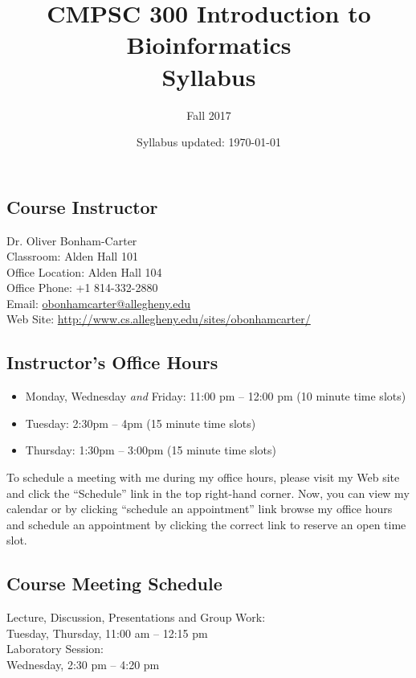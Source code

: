 \documentclass[11pt]{article} %
\title{\textbf{CMPSC 300 Introduction to Bioinformatics\\Syllabus}}
\author{Fall 2017}
\date{Syllabus updated: \today} %
\begin{document}
\maketitle

\subsection*{\textbf{Course Instructor}}
Dr. Oliver Bonham-Carter\\
\noindent Classroom: Alden Hall 101 \\
\noindent Office Location: Alden Hall 104 \\
\noindent Office Phone: +1 814-332-2880 \\
\noindent Email: \url{obonhamcarter@allegheny.edu} \\
\noindent Web Site: \url{http://www.cs.allegheny.edu/sites/obonhamcarter/} \\

\subsection*{\textbf{Instructor's Office Hours}}

\begin{itemize}
	\itemsep 0em
	\item Monday, Wednesday \emph{and} Friday: 11:00 pm -- 12:00 pm (10 minute time slots)
	\item Tuesday: 2:30pm -- 4pm (15 minute time slots)
	\item Thursday: 1:30pm -- 3:00pm (15 minute time slots)
\end{itemize}

\noindent
To schedule a meeting with me during my office hours, please visit my Web site and click the ``Schedule'' link in the top right-hand corner. Now, you can view my calendar or by clicking ``schedule an appointment'' link browse my office hours and schedule an appointment by clicking the correct link to reserve an open time slot. 


\subsection*{\textbf{Course Meeting Schedule}}

Lecture, Discussion, Presentations and Group Work:\\
\indent
Tuesday, Thursday, 11:00 am -- 12:15 pm \\
Laboratory Session:\\
\indent Wednesday, 2:30 pm -- 4:20 pm \\
\end{document}
